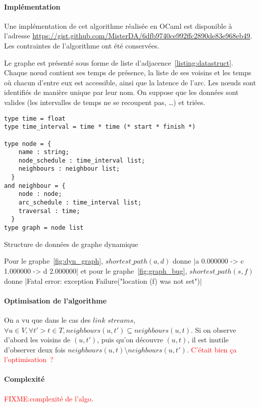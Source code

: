\documentclass[12pt,a4paper]{article}
\begin{document}
\paragraph{Implémentation}
Une implémentation de cet algorithme réalisée en OCaml est disponible
à l'adresse
\url{https://gist.github.com/MisterDA/6dfb9740ce992ffc2890de83e968eb49}. Les
contraintes de l'algorithme ont été conservées.

Le graphe est présenté sous forme de liste
d'adjacence~\ref{listing:datastruct}. Chaque nœud contient ses temps
de présence, la liste de ses voisins et les temps où chacun d'entre
eux est accessible, ainsi que la latence de l'arc. Les nœuds sont
identifiés de manière unique par leur nom. On suppose que les données
sont valides (les intervalles de temps ne se recoupent pas, …)  et
triées.

\begin{listing}[ht]
  \begin{verbatim}
type time = float
type time_interval = time * time (* start * finish *)

type node = {
    name : string;
    node_schedule : time_interval list;
    neighbours : neighbour list;
  }
and neighbour = {
    node : node;
    arc_schedule : time_interval list;
    traversal : time;
  }
type graph = node list
  \end{verbatim}
  \caption{Structure de données de graphe
    dynamique}\label{listing:datastruct}
\end{listing}

Pour le graphe~\ref{fig:dyn_graph}, \(shortest\_path(a, d)\) donne
|a 0.000000 -> c 1.000000 -> d 2.000000| et pour le
graphe~\ref{fig:graph_bug}, \(shortest\_path(s, f)\) donne
|Fatal error: exception Failure("location (f) was not
set")|

\paragraph{Optimisation de l'algorithme} On a vu que dans le cas des
\(\textit{link streams}\),
\(\forall u \in V, \forall t' > t \in T, neighbours(u, t') \subseteq
neighbours(u, t)\). Si on observe d'abord les voisins de \((u, t')\),
puis qu'on découvre \((u, t)\), il est inutile d'observer deux fois
\(neighbours(u, t) \setminus neighbours(u, t')\).
\textcolor{red}{C'était bien ça l'optimisation~?}

\paragraph{Complexité} \textcolor{red}{FIXME:\@ complexité de l'algo.}
\end{document}
